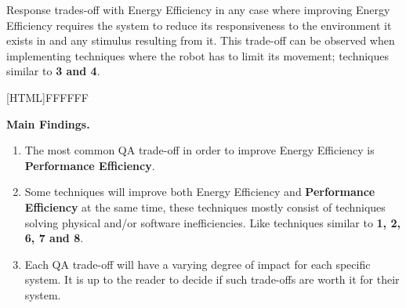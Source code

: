 Response trades-off with Energy Efficiency in any case where improving Energy Efficiency requires the system to reduce its responsiveness to 
the environment it exists in and any stimulus resulting from it. 
This trade-off can be observed when implementing techniques where the robot has to limit its movement; techniques similar to \textbf{3 and 4}.

\vspace{2mm}

\noindent{}[HTML]{FFFFFF}{\parbox{0.47\textwidth}{%
\noindent \textbf{Main Findings.}
\begin{enumerate}[nolistsep]
\item The most common QA trade-off in order to improve Energy Efficiency is \textbf{Performance Efficiency}.
\item Some techniques will improve both Energy Efficiency and \textbf{Performance Efficiency} at the same time, 
these techniques mostly consist of techniques solving physical and/or software inefficiencies.
Like techniques similar to \textbf{1, 2, 6, 7 and 8}.
\item Each QA trade-off will have a varying degree of impact for each specific system. 
It is up to the reader to decide if such trade-offs are worth it for their system.
\end{enumerate}}}
